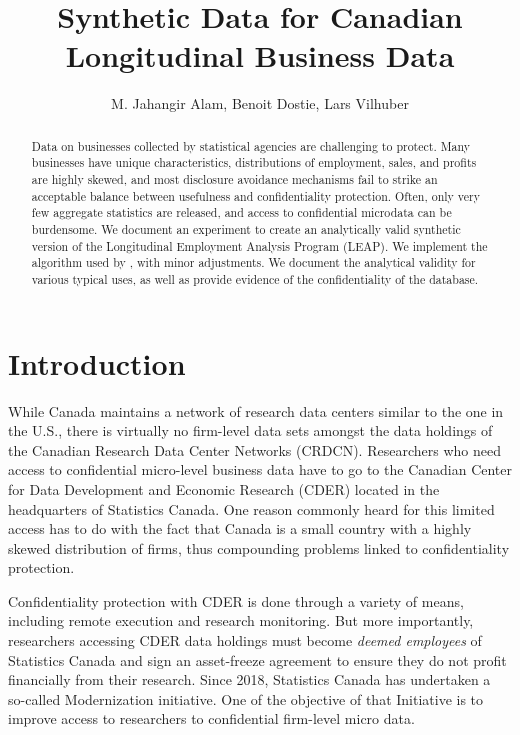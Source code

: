 \documentclass{article}
\title{Synthetic Data for Canadian Longitudinal Business Data }
\author{M. Jahangir Alam, Benoit Dostie, Lars Vilhuber}
\begin{document}
\maketitle
{}
\begin{abstract}
\noindent
Data on businesses collected by statistical agencies are challenging to protect. Many businesses have unique characteristics, distributions of employment, sales, and profits are highly skewed, and  most disclosure avoidance mechanisms  fail to strike an acceptable balance between usefulness and confidentiality protection. Often, only very few aggregate statistics are released, and access to confidential microdata can be burdensome. We document an experiment to create an analytically valid synthetic version of the Longitudinal Employment Analysis Program (LEAP). We implement the algorithm used by \cite{RePEc:bla:istatr:v:79:y:2011:i:3:p:362-384}, with minor adjustments. We document the analytical validity for various typical uses, as well as provide evidence of the  confidentiality of the database.


\end{abstract}
\newpage
\tableofcontents
\newpage
\section{Introduction}
While Canada maintains a network of research data centers similar to the one in the U.S., there is virtually no firm-level data sets amongst the data holdings of the Canadian Research Data Center Networks (CRDCN). Researchers who need access to confidential micro-level business data have to go to the Canadian Center for Data Development and Economic Research (CDER) located in the headquarters of Statistics Canada. One reason commonly heard for this limited access has to do with the fact that Canada is a small country with a highly skewed distribution of firms, thus compounding problems linked to confidentiality protection. 

Confidentiality protection with CDER is done through a variety of means, including remote execution and research monitoring. But more importantly, researchers accessing CDER data holdings must become \textit{deemed employees} of Statistics Canada and sign an asset-freeze agreement to ensure they do not profit financially from their research. Since 2018, Statistics Canada has undertaken a so-called Modernization initiative. One of the objective of that Initiative is to improve access to researchers to confidential firm-level micro data.
\end{document}
